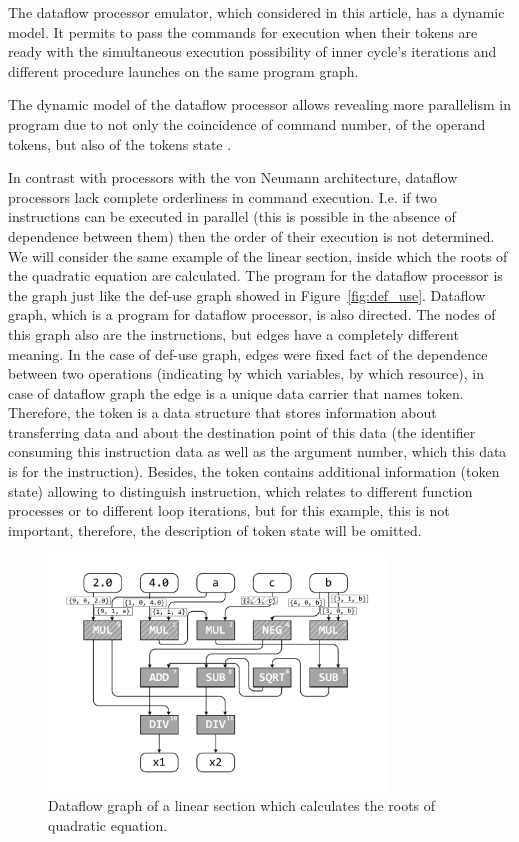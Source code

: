 \documentclass[
11pt,%
tightenlines,%
twoside,%
onecolumn,%
nofloats,%
nobibnotes,%
nofootinbib,%
superscriptaddress,%
noshowpacs,%
centertags]%
{revtex4}
\begin{document}
The dataflow processor emulator, which considered in this article, has a dynamic model.
It permits to pass the commands for execution when their tokens are ready with the simultaneous execution possibility of inner cycle’s iterations and different procedure launches on the same program graph.

The dynamic model of the dataflow processor allows revealing more parallelism in program due to not only the coincidence of command number, of the operand tokens, but also of the tokens state \cite{Wiley}.

In contrast with processors with the von Neumann architecture, dataflow processors lack complete orderliness in command execution.
I.e. if two instructions can be executed in parallel (this is possible in the absence of dependence between them) then the order of their execution is not determined.
We will consider the same example of the linear section, inside which the roots of the quadratic equation are calculated.
The program for the dataflow processor is the graph just like the def-use graph showed in Figure~\ref{fig:def_use}.
Dataflow graph, which is a program for dataflow processor, is also directed.
The nodes of this graph also are the instructions, but edges have a completely different meaning.
In the case of def-use graph, edges were fixed fact of the dependence between two operations (indicating by which variables, by which resource), in case of dataflow graph the edge is a unique data carrier that names token.
Therefore, the token is a data structure that stores information about transferring data and about the destination point of this data (the identifier consuming this instruction data as well as the argument number, which this data is for the instruction).
Besides, the token contains additional information (token state) allowing to distinguish instruction, which relates to different function processes or to different loop iterations, but for this example, this is not important, therefore, the description of token state will be omitted.

\begin{figure}[h]
\setcaptionmargin{5mm}
\onelinecaptionsfalse %
\includegraphics[width=0.80\textwidth]{pics/dataflow.pdf}
\caption{Dataflow graph of a linear section which calculates the roots of quadratic equation.}\label{fig:dataflow}
\end{figure}
\end{document}
